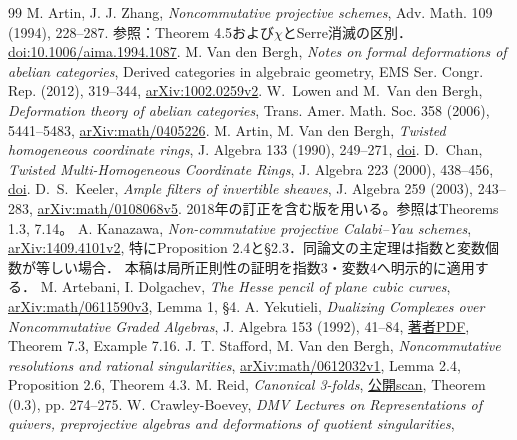 \documentclass[11pt,a4paper]{ltjsarticle}
\theoremstyle{definition}\newtheorem{definition}[theorem]{定義}
\begin{document}
\begin{thebibliography}{99}
 M. Artin, J. J. Zhang,
\emph{Noncommutative projective schemes}, Adv. Math. 109 (1994), 228--287.
参照：Theorem 4.5および$\chi$とSerre消滅の区別．
\href{https://doi.org/10.1006/aima.1994.1087}{doi:10.1006/aima.1994.1087}.
 M. Van den Bergh,
\emph{Notes on formal deformations of abelian categories},
Derived categories in algebraic geometry, EMS Ser. Congr. Rep. (2012), 319--344,
\href{https://arxiv.org/abs/1002.0259v2}{arXiv:1002.0259v2}.
 W.~Lowen and M.~Van den Bergh,
\emph{Deformation theory of abelian categories}, Trans. Amer. Math. Soc. 358 (2006),
5441--5483, \href{https://arxiv.org/abs/math/0405226}{arXiv:math/0405226}.
 M. Artin, M. Van den Bergh,
\emph{Twisted homogeneous coordinate rings}, J. Algebra 133 (1990), 249--271,
\href{https://doi.org/10.1016/0021-8693(90)90269-T}{doi}.
 D.~Chan,
\emph{Twisted Multi-Homogeneous Coordinate Rings},
J. Algebra 223 (2000), 438--456,
\href{https://doi.org/10.1006/jabr.1999.7938}{doi}.
 D.~S.~Keeler,
\emph{Ample filters of invertible sheaves}, J. Algebra 259 (2003), 243--283,
\href{https://arxiv.org/abs/math/0108068v5}{arXiv:math/0108068v5}.
2018年の訂正を含む版を用いる。参照はTheorems 1.3, 7.14。
 A. Kanazawa,
\emph{Non-commutative projective Calabi--Yau schemes},
\href{https://arxiv.org/abs/1409.4101}{arXiv:1409.4101v2},
特にProposition 2.4と\S2.3．同論文の主定理は指数と変数個数が等しい場合．
本稿は局所正則性の証明を指数3・変数4へ明示的に適用する．
 M. Artebani, I. Dolgachev,
\emph{The Hesse pencil of plane cubic curves},
\href{https://arxiv.org/abs/math/0611590}{arXiv:math/0611590v3}, Lemma 1, \S4.
 A. Yekutieli,
\emph{Dualizing Complexes over Noncommutative Graded Algebras},
J. Algebra 153 (1992), 41--84,
\href{https://www.math.bgu.ac.il/~amyekut/publications/dual-com/dual-com.pdf}{著者PDF},
Theorem 7.3, Example 7.16.
 J. T. Stafford, M. Van den Bergh,
\emph{Noncommutative resolutions and rational singularities},
\href{https://arxiv.org/abs/math/0612032}{arXiv:math/0612032v1},
Lemma 2.4, Proposition 2.6, Theorem 4.3.
 M. Reid, \emph{Canonical 3-folds},
\href{https://webhomes.maths.ed.ac.uk/cheltsov/quotient/pdf/reid1.pdf}{公開scan},
Theorem (0.3), pp. 274--275.
 W. Crawley-Boevey,
\emph{DMV Lectures on Representations of quivers, preprojective algebras and deformations of quotient singularities},

\end{thebibliography}
\end{document}
